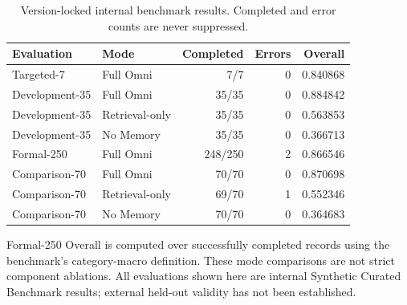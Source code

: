 \begin{table}[t]
\centering
\caption{Version-locked internal benchmark results. Completed and error counts are never suppressed.}
\label{tab:main-results}
\begin{tabular}{llrrr}
\toprule
Evaluation & Mode & Completed & Errors & Overall \\
\midrule
Targeted-7 & Full Omni & 7/7 & 0 & 0.840868 \\
Development-35 & Full Omni & 35/35 & 0 & 0.884842 \\
Development-35 & Retrieval-only & 35/35 & 0 & 0.563853 \\
Development-35 & No Memory & 35/35 & 0 & 0.366713 \\
Formal-250 & Full Omni & 248/250 & 2 & 0.866546 \\
Comparison-70 & Full Omni & 70/70 & 0 & 0.870698 \\
Comparison-70 & Retrieval-only & 69/70 & 1 & 0.552346 \\
Comparison-70 & No Memory & 70/70 & 0 & 0.364683 \\
\bottomrule
\end{tabular}
\begin{minipage}{0.96\textwidth}\footnotesize
Formal-250 Overall is computed over successfully completed records using the benchmark's category-macro definition. These mode comparisons are not strict component ablations. All evaluations shown here are internal Synthetic Curated Benchmark results; external held-out validity has not been established.
\end{minipage}
\end{table}
